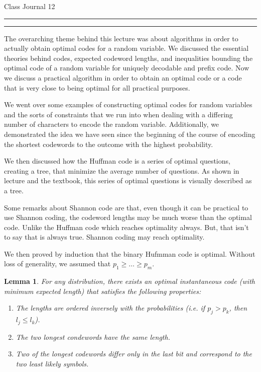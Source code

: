 \documentclass{article}
\newtheorem{lemma}{Lemma}
\newcounter{questionCounter}
\newcounter{partCounter}[questionCounter]
\newenvironment{question}[2][\arabic{questionCounter}]{%
    \setcounter{partCounter}{0}%
    \vspace{.25in} \hrule \vspace{0.5em}%
        \noindent{\bf \large#2}%
    \vspace{0.5em} \hrule \vspace{.10in}%
    \addtocounter{questionCounter}{1}%
}{}
\begin{document}
\begin{center}
{\Huge Class Journal 12}\\
\end{center}

\vspace{5mm}


\vspace{5mm}


\begin{question}{Main Theorems/Ideas in the lecture}
The overarching theme behind this lecture was about algorithms in order to actually obtain optimal codes for a random variable. We discussed the essential theories behind codes, expected codeword lengths, and inequalities bounding the optimal code of a random variable for uniquely decodable and prefix code. Now we discuss a practical algorithm in order to obtain an optimal code or a code that is very close to being optimal for all practical purposes.

We went over some examples of constructing optimal codes for random variables and the sorts of constraints that we run into when dealing with a differing number of characters to encode the random variable. Additionally, we demonstrated the idea we have seen since the beginning of the course of encoding the shortest codewords to the outcome with the highest probability.

We then discussed how the Huffman code is a series of optimal questions, creating a tree, that minimize the average number of questions. As shown in lecture and the textbook, this series of optimal questions is visually described as a tree.

Some remarks about Shannon code are that, even though it can be practical to use Shannon coding, the codeword lengths may be much worse than the optimal code. Unlike the Huffman code which reaches optimality always. But, that isn't to say that is always true. Shannon coding may reach optimality.

We then proved by induction that the binary Hufmman code is optimal. Without loss of generality, we assumed that $p_1\geq \ldots \geq p_m$.

\begin{lemma} For any distribution, there exists an optimal instantaneous code (with minimum expected length) that satisfies the following properties:
\begin{enumerate}
    \item The lengths are ordered inversely with the probabilities (i.e. if $p_j > p_k$, then $l_j \leq l_k$).
    \item The two longest condewords have the same length.
    \item Two of the longest codewords differ only in the last bit and correspond to the two least likely symbols.
\end{enumerate}
\end{lemma}


\end{question}
\end{document}
